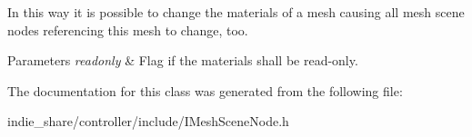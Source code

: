 In this way it is possible to change the materials of a mesh causing all mesh scene nodes referencing this mesh to change, too. 
\begin{DoxyParams}{Parameters}
{\em readonly} & Flag if the materials shall be read-\/only. \\
\hline
\end{DoxyParams}


The documentation for this class was generated from the following file\+:\begin{DoxyCompactItemize}
\item 
indie\+\_\+share/controller/include/I\+Mesh\+Scene\+Node.\+h\end{DoxyCompactItemize}
